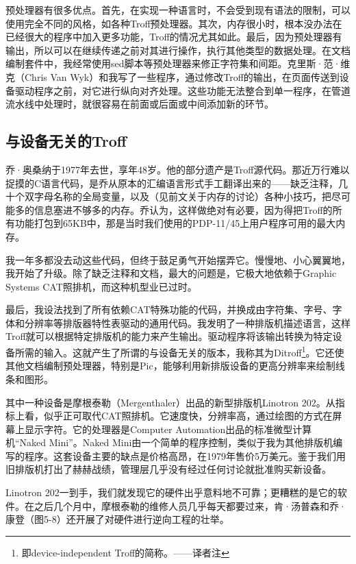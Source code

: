 \documentclass[a4paper,12pt,UTF8,twoside]{ctexbook}
\begin{document}
预处理器有很多优点。首先，在实现一种语言时，不会受到现有语法的限制，可以使用完全不同的风格，如各种Troff预处理器。其次，内存很小时，根本没办法在已经很大的程序中加入更多功能，Troff的情况尤其如此。最后，因为预处理器有输出，所以可以在继续传递之前对其进行操作，执行其他类型的数据处理。在文档编制套件中，我经常使用sed脚本等预处理器来修正字符集和间距。克里斯·范·维克（Chris Van Wyk）和我写了一些程序，通过修改Troff的输出，在页面传送到设备驱动程序之前，对它进行纵向对齐处理。这些功能无法整合到单一程序，在管道流水线中处理时，就很容易在前面或后面或中间添加新的环节。

\subsection{与设备无关的Troff}

乔·奥桑纳于1977年去世，享年48岁。他的部分遗产是Troff源代码。那近万行难以捉摸的C语言代码，是乔从原本的汇编语言形式手工翻译出来的——缺乏注释，几十个双字母名称的全局变量，以及（见前文关于内存的讨论）各种小技巧，把尽可能多的信息塞进不够多的内存。乔认为，这样做绝对有必要，因为得把Troff的所有功能打包到65KB中，那是当时我们使用的PDP-11/45上用户程序可用的最大内存。

我一年多都没去动这些代码，但终于鼓足勇气开始摆弄它。慢慢地、小心翼翼地，我开始了升级。除了缺乏注释和文档，最大的问题是，它极大地依赖于Graphic Systems CAT照排机，而这种机型业已过时。

最后，我设法找到了所有依赖CAT特殊功能的代码，并换成由字符集、字号、字体和分辨率等排版器特性表驱动的通用代码。我发明了一种排版机描述语言，这样Troff就可以根据特定排版机的能力来产生输出。驱动程序将该输出转换为特定设备所需的输入。这就产生了所谓的与设备无关的版本，我称其为Ditroff\footnote{即device-independent Troff的简称。——译者注}。它还使其他文档编制预处理器，特别是Pic，能够利用新排版设备的更高分辨率来绘制线条和图形。

其中一种设备是摩根泰勒（Mergenthaler）出品的新型排版机Linotron 202。从指标上看，似乎正可取代CAT照排机。它速度快，分辨率高，通过绘图的方式在屏幕上显示字符。它的处理器是Computer Automation出品的标准微型计算机“Naked Mini”。Naked Mini由一个简单的程序控制，类似于我为其他排版机编写的程序。这套设备主要的缺点是价格高昂，在1979年售价5万美元。鉴于我们用旧排版机打出了赫赫战绩，管理层几乎没有经过任何讨论就批准购买新设备。

Linotron 202一到手，我们就发现它的硬件出乎意料地不可靠；更糟糕的是它的软件。在之后几个月中，摩根泰勒的维修人员几乎每天都要过来，肯·汤普森和乔·康登（图5-8）还开展了对硬件进行逆向工程的壮举。
\end{document}
